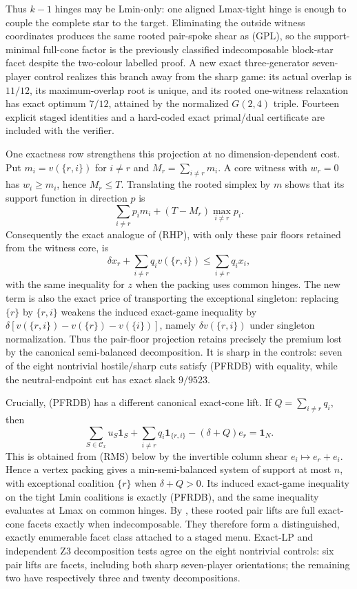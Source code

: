 \documentclass[11pt]{article}
\begin{document}
Thus $k-1$ hinges may be Lmin-only: one aligned Lmax-tight hinge is enough
to couple the complete star to the target.  Eliminating the outside witness
coordinates produces the same rooted pair-spoke shear as (GPL), so the
support-minimal full-cone factor is the previously classified indecomposable
block-star facet despite the two-colour labelled proof.  A new exact
three-generator seven-player control realizes this branch away from the
sharp game: its actual overlap is $11/12$, its maximum-overlap root is unique,
and its rooted one-witness relaxation has exact optimum $7/12$, attained by
the normalized $G(2,4)$ triple.  Fourteen explicit staged identities and a
hard-coded exact primal/dual certificate are included with the verifier.

One exactness row strengthens this projection at no dimension-dependent
cost.  Put $m_i=v(\{r,i\})$ for $i\ne r$ and
$M_r=\sum_{i\ne r}m_i$.  A core witness with $w_r=0$ has
$w_i\ge m_i$, hence $M_r\le T$.  Translating the rooted simplex by $m$
shows that its support function in direction $p$ is
\[
 \sum_{i\ne r}p_i m_i+(T-M_r)\max_{i\ne r}p_i.
\]
Consequently the exact analogue of (RHP), with only these pair floors
retained from the witness core, is
\[
 \delta x_r+\sum_{i\ne r}q_i v(\{r,i\})
 \le \sum_{i\ne r}q_i x_i,                            \tag{PFRDB}
\]
with the same inequality for $z$ when the packing uses common hinges.  The
new term is also the exact price of transporting the exceptional singleton:
replacing $\{r\}$ by $\{r,i\}$ weakens the induced exact-game inequality by
$\delta[v(\{r,i\})-v(\{r\})-v(\{i\})]$, namely
$\delta v(\{r,i\})$ under singleton normalization.  Thus the pair-floor
projection retains precisely the premium lost by the canonical
semi-balanced decomposition.  It is sharp in the controls: seven of the
eight nontrivial hostile/sharp cuts satisfy (PFRDB) with equality, while the
neutral-endpoint cut has exact slack $9/9523$.

Crucially, (PFRDB) has a different canonical exact-cone lift.  If
$Q=\sum_{i\ne r}q_i$, then
\[
 \sum_{S\in\mathcal C_x}u_S\mathbf1_S
 +\sum_{i\ne r}q_i\mathbf1_{\{r,i\}}-(\delta+Q)e_r
 =\mathbf1_N.                                         \tag{RPL}
\]
This is obtained from (RMS) below by the invertible column shear
$e_i\mapsto e_r+e_i$.  Hence a vertex packing gives a min-semi-balanced
system of support at most $n$, with exceptional coalition $\{r\}$ when
$\delta+Q>0$.  Its induced exact-game inequality on the tight Lmin
coalitions is exactly (PFRDB), and the same inequality evaluates at Lmax on
common hinges.  By \citet{StudenyKratochvil2022}, these rooted pair lifts are
full exact-cone facets exactly when indecomposable.  They therefore form a
distinguished, exactly enumerable facet class attached to a staged menu.
Exact-LP and independent Z3 decomposition tests agree on the eight
nontrivial controls: six pair lifts are facets, including both sharp
seven-player orientations; the remaining two have respectively three and
twenty decompositions.
\end{document}
